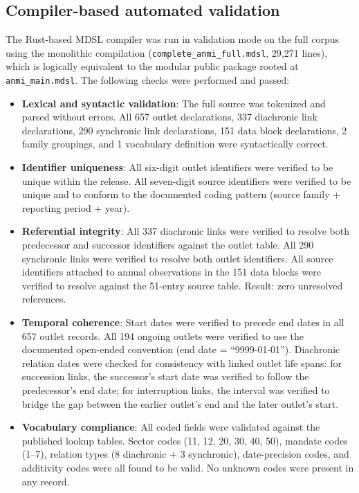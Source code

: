\documentclass[11pt]{article}
\begin{document}
\subsection{Compiler-based automated validation}

The Rust-based MDSL compiler was run in validation mode on the full corpus using the monolithic compilation (\texttt{complete\_anmi\_full.mdsl}, 29{,}271 lines), which is logically equivalent to the modular public package rooted at \texttt{anmi\_main.mdsl}. The following checks were performed and passed:

\begin{itemize}
\item \textbf{Lexical and syntactic validation}: The full source was tokenized and parsed without errors. All 657 outlet declarations, 337 diachronic link declarations, 290 synchronic link declarations, 151 data block declarations, 2 family groupings, and 1 vocabulary definition were syntactically correct.

\item \textbf{Identifier uniqueness}: All six-digit outlet identifiers were verified to be unique within the release. All seven-digit source identifiers were verified to be unique and to conform to the documented coding pattern (source family + reporting period + year).

\item \textbf{Referential integrity}: All 337 diachronic links were verified to resolve both predecessor and successor identifiers against the outlet table. All 290 synchronic links were verified to resolve both outlet identifiers. All source identifiers attached to annual observations in the 151 data blocks were verified to resolve against the 51-entry source table. Result: zero unresolved references.

\item \textbf{Temporal coherence}: Start dates were verified to precede end dates in all 657 outlet records. All 194 ongoing outlets were verified to use the documented open-ended convention (end date = ``9999-01-01''). Diachronic relation dates were checked for consistency with linked outlet life spans: for succession links, the successor's start date was verified to follow the predecessor's end date; for interruption links, the interval was verified to bridge the gap between the earlier outlet's end and the later outlet's start.

\item \textbf{Vocabulary compliance}: All coded fields were validated against the published lookup tables. Sector codes (11, 12, 20, 30, 40, 50), mandate codes (1--7), relation types (8 diachronic + 3 synchronic), date-precision codes, and additivity codes were all found to be valid. No unknown codes were present in any record.
\end{itemize}
\end{document}
